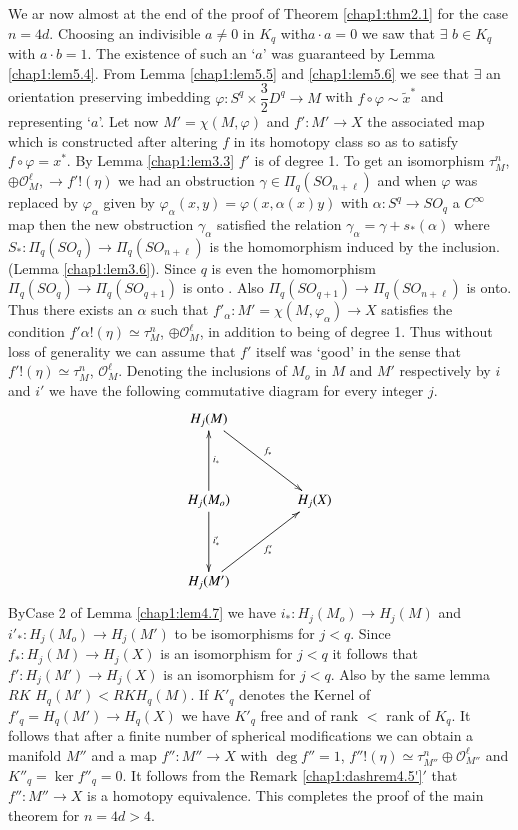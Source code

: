 We ar now almost at the end of the proof of Theorem \ref{chap1:thm2.1} for the case
$n = 4d$. Choosing an indivisible $a \neq 0$ in $K_q$
with\pageoriginale $a \cdot a=0$ 
we saw that $\exists$ $b \in K_q$ with $a \cdot b = 1$. The existence of
such an `$a$' was guaranteed by Lemma \ref{chap1:lem5.4}. From Lemma
\ref{chap1:lem5.5} and \ref{chap1:lem5.6} we
see that $\exists$ an orientation preserving imbedding $\varphi: S^q
\times \dfrac{3}{2} D^q \to M$ with $f \circ \varphi \sim \tilde{x}^*$ and
representing `$a$'. Let now $M' = \chi (M, \varphi)$ and $f': M' \to
X$ the associated map which is constructed after altering $f$ in its
homotopy class so as to satisfy $f \circ \varphi = x^*$. By Lemma
\ref{chap1:lem3.3} $f'$ 
is of degree 1. To get an isomorphism $\tau^n_M$, $\oplus \mathscr{O}^\ell_M,
\to f' ! (\eta)$ we had an obstruction $\gamma \in \Pi_q
(SO_{n+\ell})$ and when $\varphi$ was replaced by $\varphi_\alpha $
given by $\varphi_\alpha (x, y) = \varphi (x, \alpha (x) y)$ with
$\alpha: S^q \to SO_q$ a $C^\infty$ map then the new obstruction
$\gamma_\alpha$ satisfied the relation $\gamma_\alpha = \gamma + s_*
(\alpha)$ where $S_* : \Pi_q (SO_q) \to \Pi_q (SO_{n +\ell})$ is the
homomorphism induced by the inclusion. (Lemma \ref{chap1:lem3.6}). Since $q$ is even
the homomorphism $\Pi_q (SO_q) \to \Pi_q (SO_{q+1})$ is onto
\cite{c1:key8}. Also 
$\Pi_q (SO_{q+1}) \to \Pi_q (SO_{n+ \ell})$ is onto. Thus there exists
an $\alpha$ such that $f'_\alpha: M' = \chi (M, \varphi_\alpha) \to
X$ satisfies the condition $f' \alpha ! (\eta ) \simeq \tau^n_M$,
$\oplus \mathscr{O}^\ell_M$, in addition to being of degree 1. Thus
without loss of generality we can assume that $f'$ itself was `good'
in the sense that $f' ! (\eta) \simeq \tau^n_M$,
$\mathscr{O}^\ell_M$. Denoting the inclusions of $M_o$ in $M$ and $M'$
respectively by $i$ and $i'$ we have the following commutative diagram
for every integer $j$. 
\[
\xymatrix@R=1.5cm@C=1.5cm{
H_j(M) \ar[dr]^{f_*} & \\
H_j (M_o) \ar[u]_{i_*} \ar[d]^{i'_*} &  H_j(X)\\
H_j(M') \ar[ur]_{f'_*} & 
}
\]
By\pageoriginale Case 2 of Lemma \ref{chap1:lem4.7} we have $i_*: H_j (M_o) \to
H_j (M)$ and 
$i'_*:H_j (M_o) \to H_j (M')$ to be isomorphisms for $j< q$. Since
$f_*: H_j (M) \to H_j (X)$ is an isomorphism for $j < q$ it follows
that $f': H_j (M')\to H_j(X)$ is an isomorphism for $j < q$. Also by
the same lemma $RK$ $H_q (M') < RK H_q (M)$. If $K'_q$ denotes the
Kernel of $f'_q = H_q (M') \to H_q (X)$ we have $K'_q$ free and of
rank $<$ rank of $K_q$. It follows that after a finite number of
spherical modifications we can obtain a manifold $M''$ and a map $f'':
M'' \to X$ with $\deg f'' = 1$, $f'' ! (\eta) \simeq \tau^{n}_{M''}
\oplus \mathscr{O}^\ell_{M''}$ and $K''_{q}= \ker f''_{q} = 0$. It
follows from the Remark \ref{chap1:dashrem4.5'}$'$ that $f'': M'' \to
X$ is a homotopy equivalence. This completes the proof of the main
theorem for $n= 4d > 4$.  

